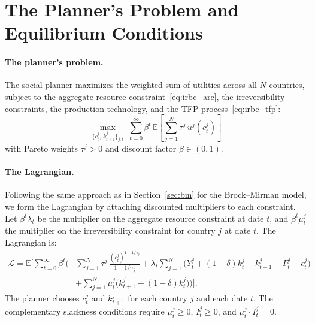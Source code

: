 \documentclass[11pt,a4paper]{report}
\newcommand{\E}[1]{\mathbb{E}\!\left[#1\right]}
\begin{document}
\section{The Planner's Problem and Equilibrium Conditions}
\label{sec:irbc_planner_problem}

\paragraph{The planner's problem.}  The social planner maximizes the weighted sum of utilities across all $N$ countries, subject to the aggregate resource constraint~\eqref{eq:irbc_arc}, the irreversibility constraints, the production technology, and the TFP process~\eqref{eq:irbc_tfp}:
\begin{equation}
\max_{\{c_t^j,\, k_{t+1}^j\}_{j,t}} \; \sum_{t=0}^{\infty} \beta^t \, \E{\sum_{j=1}^{N} \tau^j \, u^j(c_t^j)}
\label{eq:irbc_planner}
\end{equation}
with Pareto weights $\tau^j > 0$ and discount factor $\beta \in (0,1)$.

\paragraph{The Lagrangian.}  Following the same approach as in Section~\ref{sec:bm} for the Brock--Mirman model, we form the Lagrangian by attaching discounted multipliers to each constraint.  Let $\beta^t \lambda_t$ be the multiplier on the aggregate resource constraint at date $t$, and $\beta^t \mu_t^j$ the multiplier on the irreversibility constraint for country $j$ at date $t$.  The Lagrangian is:
\begin{equation}
\begin{split}
\mathcal{L} = \mathbb{E}\Biggl[\sum_{t=0}^{\infty} \beta^t \Biggl(
&\sum_{j=1}^{N} \tau^j \, \frac{(c_t^j)^{1-1/\gamma_j}}{1-1/\gamma_j}
+ \lambda_t \sum_{j=1}^{N} \bigl(Y_t^j + (1-\delta)k_t^j - k_{t+1}^j - \Gamma_t^j - c_t^j\bigr) \\
&+ \sum_{j=1}^{N} \mu_t^j \bigl(k_{t+1}^j - (1-\delta)k_t^j\bigr)
\Biggr)\Biggr].
\end{split}
\label{eq:irbc_lagrangian}
\end{equation}
The planner chooses $c_t^j$ and $k_{t+1}^j$ for each country $j$ and each date $t$.  The complementary slackness conditions require $\mu_t^j \geq 0$, $I_t^j \geq 0$, and $\mu_t^j \cdot I_t^j = 0$.
\end{document}
